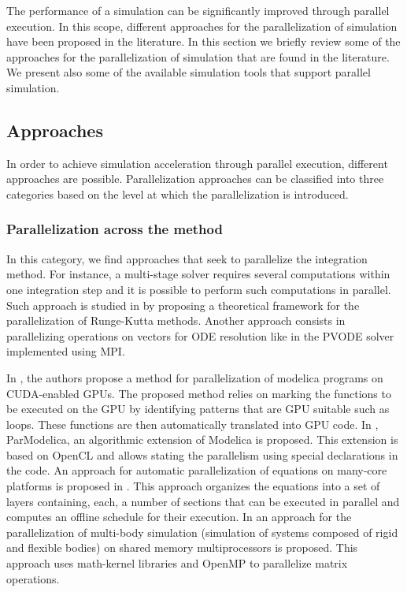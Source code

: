 The performance of a simulation can be significantly improved through parallel execution. In this scope, different approaches for the parallelization of simulation have been proposed in the literature. In this section we briefly review some of the approaches for the parallelization of simulation that are found in the literature. We present also some of the available simulation tools that support parallel simulation.

\subsection{\label{subsec:parsimaprr}Approaches}

In order to achieve simulation acceleration through parallel execution, different approaches are possible. Parallelization approaches can be classified into three categories based on the level at which the parallelization is introduced.

\subsubsection{Parallelization across the method}
In this category, we find approaches that seek to parallelize the integration method. For instance, a multi-stage solver requires several computations within one integration step and it is possible to perform such computations in parallel. Such approach is studied in \cite{iserles:1990} by proposing a theoretical framework for the parallelization of Runge-Kutta methods. Another approach consists in parallelizing operations on vectors for ODE resolution like in the PVODE solver \cite{byrne:1999} implemented using MPI. 

In \cite{elmqvist:2015}, the authors propose a method for parallelization of modelica programs on CUDA-enabled GPUs. The proposed method relies on marking the functions to be executed on the GPU by identifying patterns that are GPU suitable such as loops. These functions are then automatically translated into GPU code. In \cite{Gebremedhin2012}, ParModelica, an algorithmic extension of Modelica is proposed. This extension is based on OpenCL and allows stating the parallelism using special declarations in the code. An approach for automatic parallelization of equations on many-core platforms is proposed in \cite{elmqvist:2014}. This approach organizes the equations into a set of layers containing, each, a number of sections that can be executed in parallel and computes an offline schedule for their execution. In \cite{clauberg:2012} an approach for the parallelization of multi-body simulation (simulation of systems composed of rigid and flexible bodies) on shared memory multiprocessors is proposed. This approach uses math-kernel libraries and OpenMP to parallelize matrix operations.

